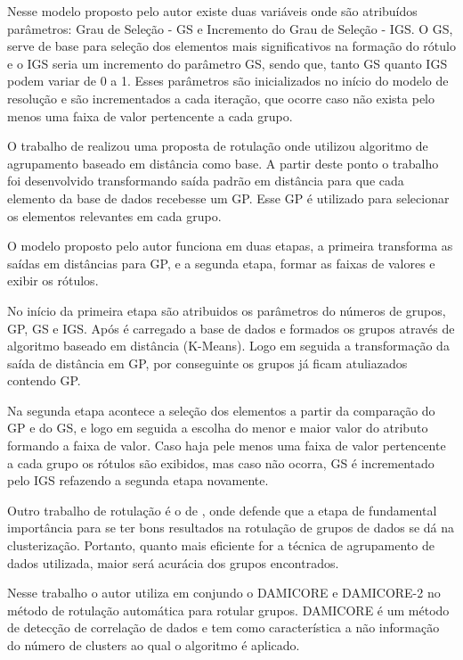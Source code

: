 Nesse modelo proposto pelo autor existe duas variáveis onde são atribuídos parâmetros: Grau de Seleção - GS e Incremento do Grau de Seleção - IGS. O GS, serve de base para seleção dos elementos mais significativos na formação do rótulo e o IGS seria um incremento do parâmetro GS, sendo que, tanto GS quanto IGS podem variar de 0 a 1. Esses parâmetros são inicializados no início do modelo de resolução e são incrementados a cada iteração, que ocorre caso não exista pelo menos uma faixa de valor pertencente a cada grupo.

O trabalho de  realizou uma proposta de rotulação onde utilizou algoritmo de agrupamento baseado em distância como base. A partir deste ponto o trabalho foi desenvolvido transformando saída padrão em distância para que cada elemento da base de dados recebesse um GP. Esse GP é utilizado para selecionar os elementos relevantes em cada grupo.

O modelo proposto pelo autor funciona em duas etapas, a primeira transforma as saídas em distâncias para GP, e a segunda etapa, formar as faixas de valores e exibir os rótulos.

No início da primeira etapa são atribuidos os parâmetros do números de grupos, GP, GS e IGS. Após é carregado a base de dados e formados os grupos através de algoritmo baseado em distância (K-Means). Logo em seguida a transformação da saída de distância em GP, por conseguinte os grupos já ficam atuliazados contendo GP.

Na segunda etapa acontece a seleção dos elementos a partir da comparação do GP e do GS, e logo em seguida a escolha do menor e maior valor do atributo formando a faixa de valor. Caso haja pele menos uma faixa de valor pertencente a cada grupo os rótulos são exibidos, mas caso não ocorra, GS é incrementado pelo IGS refazendo a segunda etapa novamente. 

Outro trabalho de rotulação é o de , onde defende que a etapa de fundamental importância para se ter bons resultados na rotulação de grupos de dados se dá na clusterização. Portanto, quanto mais eficiente for a técnica de agrupamento de dados utilizada, maior será  acurácia dos grupos encontrados.

Nesse trabalho o autor utiliza em conjundo o DAMICORE e DAMICORE-2 no método de rotulação automática para rotular  grupos. DAMICORE é um método de detecção de correlação de dados e tem como característica a não informação do número de clusters ao qual o algoritmo é aplicado. 

